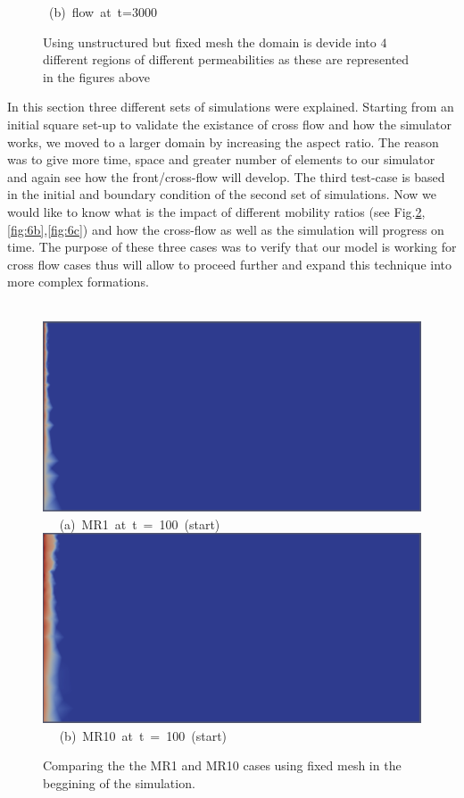 \documentclass[preprint,authoryear,12pt]{elsarticle}
\begin{document}
\begin{figure}[h]
{{}
\vspace{0.0cm}
\hbox{\hspace{5.0cm} (b) flow at t=3000  
}
}     
\caption{Using unstructured but fixed mesh the domain is devide into $4$ different regions of different permeabilities as these are represented in the figures above}
\label{fem_cv_represent_a}
\end{figure}

\medskip
In this section three different sets of simulations were explained. Starting from an initial square set-up to validate the existance of cross flow and how the simulator works, we moved to a larger domain by increasing the aspect ratio. The reason was to give more time, space and greater number of elements to our simulator and again see how the front/cross-flow will develop. The third test-case is based in the initial and boundary condition of the second set of simulations. Now we would like to know what is the impact of different mobility ratios (see Fig.\ref{fig:6a},\ref{fig:6b},\ref{fig:6c}) and how the cross-flow as well as the simulation will progress on time. The purpose of these three cases was to verify that our model is working for cross flow cases thus will allow to proceed further and expand this technique into more complex formations. 

\begin{figure}[h]
\vbox{
\hbox{\hspace{1.5cm}
\includegraphics[width=.75\textwidth]{./Pics1/mr1_fixed/mr1_fixed_100_2.pdf} 
}
\vspace{0.0cm}
\hbox{\hspace{5.0cm} (a) MR1 at t = 100 (start)   
}
\vspace{0.25cm}
\hbox{\hspace{1.5cm}
\includegraphics[width=.75\textwidth]{./Pics1/mr10_fixed/mr10_fixed_100_1.pdf}
}
\vspace{0.0cm}
\hbox{\hspace{5.0cm} (b) MR10 at t = 100 (start)  
}
}     
\caption{Comparing the the MR1 and MR10 cases using fixed mesh in the beggining of the simulation.}
\label{fig:6a}
\end{figure}
\end{document}
